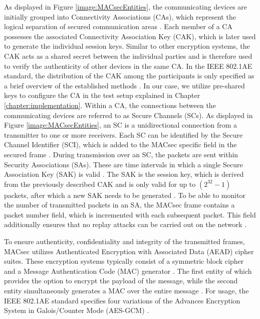 \documentclass[conference, onecolumn, a4paper]{IEEEtran}
\begin{document}
\noindent As displayed in Figure \ref{image:MACsecEntities}, the communicating devices are initially grouped into Connectivity Associations (CAs), which 
represent the logical separation of secured communication areas \cite[p. 35]{IEEE-802-1AE:2018}. Each member of a CA possesses the associated Connectivity 
Association Key (CAK), which is later used to generate the individual session keys. Similar to other encryption systems, the CAK acts as a shared 
secret between the individual parties and is therefore used to verify the authenticity of other devices in the same CA. In the IEEE 802.1AE standard, 
the distribution of the CAK among the participants is only specified as a brief overview of the established methods \cite[p. 230]{IEEE-802-1AE:2018}. 
In our case, we utilize pre-shared keys to configure the CA in the test setup explained in Chapter \ref{chapter:implementation}. Within a CA, the 
connections between the communicating devices are referred to as Secure Channels (SCs). As displayed in Figure \ref{image:MACsecEntities}, 
an SC is a unidirectional connection from a transmitter to one or more receivers. Each SC can be identified by the Secure Channel Identifier (SCI), 
which is added to the MACsec specific field in the secured frame \cite[p. 43]{IEEE-802-1AE:2018}. During transmission over an SC, the packets are sent 
within Security Associations (SAs). These are time intervals in which a single Secure Association Key (SAK) is valid \cite[p. 44]{IEEE-802-1AE:2018}. 
The SAK is the session key, which is derived from the previously described CAK and is only valid for up to ${(2^{32} -1)}$ packets, after which a new 
SAK needs to be generated \cite[p. 66]{IEEE-802-1AE:2018}. To be able to monitor the number of transmitted packets in an SA, the MACsec frame contains 
a packet number field, which is incremented with each subsequent packet. This field additionally ensures that no replay attacks can be carried out on 
the network \cite[p. 145]{IEEE-802-1AE:2018}. 

\smallskip
To ensure authenticity, confidentiality and integrity of the transmitted frames, MACsec utilizes Authenticated Encryption with Associated Data (AEAD) 
cipher suites. These encryption systems typically consist of a symmetric block cipher and a Message Authentication Code (MAC) generator 
\cite{NIST-AES_GCM:2007}. The first entity of which provides the option to encrypt the payload of the message, while the second entity simultaneously 
generates a MAC over the entire message \cite{GOOSE_confidentiality_integrity:2020}. For usage, the IEEE 802.1AE standard specifies four variations of 
the Advances Encryption System in Galois/Counter Mode (AES-GCM) \cite[p. 143ff]{IEEE-802-1AE:2018}.
\end{document}

